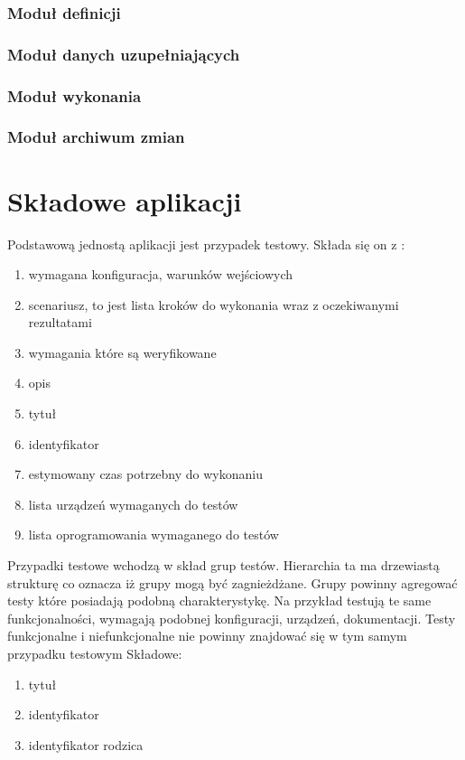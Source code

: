 \begin{enumerate}
  
\subsubsection{Moduł definicji}

\subsubsection{Moduł danych uzupełniających}

\subsubsection{Moduł wykonania }

\subsubsection{Moduł archiwum zmian }





\section{Składowe aplikacji}


Podstawową jednostą aplikacji jest przypadek testowy. Składa się on z :
\begin{enumerate}
  \item wymagana konfiguracja, warunków wejściowych
  \item scenariusz, to jest lista kroków do wykonania wraz z oczekiwanymi rezultatami
  \item wymagania które są weryfikowane 
  \item opis
  \item tytuł
  \item identyfikator
  \item estymowany czas potrzebny do wykonaniu
  \item lista urządzeń wymaganych do testów
  \item lista oprogramowania wymaganego do testów
  
\end{enumerate}



Przypadki testowe wchodzą w skład grup testów. Hierarchia ta ma drzewiastą strukturę co oznacza iż grupy mogą być zagnieżdżane. Grupy powinny agregować testy które posiadają podobną charakterystykę. Na przykład testują te same funkcjonalności, wymagają podobnej konfiguracji, urządzeń, dokumentacji. Testy funkcjonalne i niefunkcjonalne nie powinny znajdować się w tym samym przypadku testowym Składowe:
\begin{enumerate}
  \item  tytuł
  \item identyfikator
  \item identyfikator rodzica
\end{enumerate}
 




\end{enumerate}
